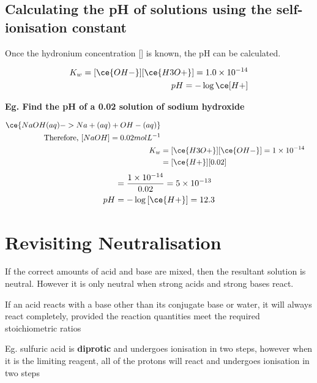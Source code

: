 	\subsection{Calculating the pH of solutions using the self-ionisation constant}
		
		Once the hydronium concentration [] is known, the pH can be calculated.

		\begin{align*}
			K_w = [\ce{OH-}][\ce{H3O+}] = 1.0 \times 10^{-14} \\
			pH = - \log{\ce[H+]}
		\end{align*}

		\textbf{Eg. Find the pH of a 0.02 \si{\molar} solution of sodium hydroxide}

			\begin{align*}
				\ce{NaOH(aq) -> Na+(aq) + OH-(aq)} \\
				\text{Therefore, }[NaOH] = 0.02 mol L^{-1} \\
				K_w &= [\ce{H3O+}][\ce{OH-}] = 1 \times 10^{-14} \\
				    &= [\ce{H+}][0.02]
			\end{align*}
			\begin{align*}
				[\ce{H+}] &= \frac{1 \times 10^{-14}}{0.02} = 5 \times 10^{-13} \\
				pH &= - \log{[\ce{H+}]} = 12.3
			\end{align*}


\section{Revisiting Neutralisation} \label{05/03/2025}

	If the correct amounts of acid and base are mixed, then the resultant solution is neutral. However it is only neutral when strong acids and strong bases react.

	If an acid reacts with a base other than its conjugate base or water, it will always react completely, provided the reaction quantities meet the required stoichiometric ratios

	Eg. sulfuric acid is \textbf{diprotic} and undergoes ionisation in two steps, however when it is the limiting reagent, all of the protons will react and undergoes ionisation in two steps

	\begin{center}
	\end{center}

